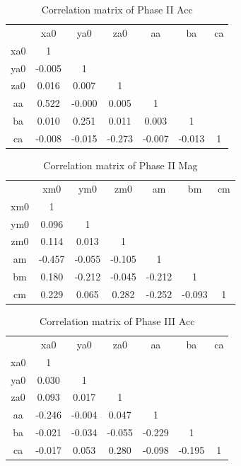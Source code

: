 \begin{table}[H]
    \centering
    \begin{tabular}{c|c|c|c|c|c|c}
             &   xa0  &   ya0  &   za0  &   aa   &   ba   & ca \\
         xa0 &  1     &        &        &        &        &    \\
         ya0 & -0.005 &  1     &        &        &        &    \\
         za0 &  0.016 &  0.007 &  1     &        &        &    \\
         aa  &  0.522 & -0.000 &  0.005 &  1     &        &    \\
         ba  &  0.010 &  0.251 &  0.011 &  0.003 &  1     &    \\
         ca  & -0.008 & -0.015 & -0.273 & -0.007 & -0.013 &  1 \\
    \end{tabular}
    \caption{Correlation matrix of Phase II Acc}
\end{table}

\begin{table}[H]
    \centering
    \begin{tabular}{c|c|c|c|c|c|c}
             &   xm0  & ym0    &   zm0  &   am   &   bm   & cm \\
         xm0 &  1     &        &        &        &        &    \\
         ym0 &  0.096 &  1     &        &        &        &    \\
         zm0 &  0.114 &  0.013 &  1     &        &        &    \\
         am  & -0.457 & -0.055 & -0.105 &  1     &        &    \\
         bm  &  0.180 & -0.212 & -0.045 & -0.212 &  1     &    \\
         cm  &  0.229 &  0.065 &  0.282 & -0.252 & -0.093 & 1  \\
    \end{tabular}
    \caption{Correlation matrix of Phase II Mag}
\end{table}

\begin{table}[H]
    \centering
    \begin{tabular}{c|c|c|c|c|c|c}
             &   xa0  &   ya0  &   za0  &   aa   &   ba   & ca \\
         xa0 &  1     &        &        &        &        &    \\
         ya0 &  0.030 &  1     &        &        &        &    \\
         za0 &  0.093 &  0.017 &  1     &        &        &    \\
         aa  & -0.246 & -0.004 &  0.047 &  1     &        &    \\
         ba  & -0.021 & -0.034 & -0.055 & -0.229 &  1     &    \\
         ca  & -0.017 &  0.053 &  0.280 & -0.098 & -0.195 &  1 \\
    \end{tabular}
    \caption{Correlation matrix of Phase III Acc}
    \label{tab:my_label}
\end{table}

